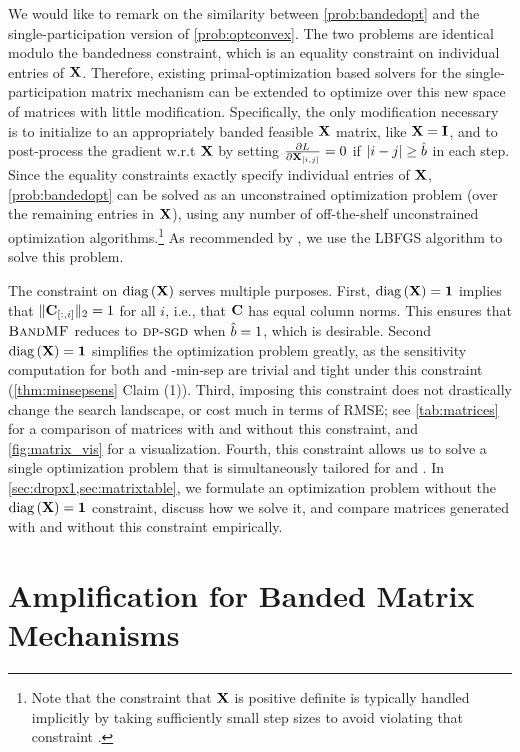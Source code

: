 \documentclass{article}
\begin{document}
%
We would like to remark on the similarity between \cref{prob:bandedopt} and the single-participation version of \cref{prob:optconvex}.  The two problems are identical modulo the bandedness constraint, which is an equality constraint on individual entries of $\mathbf{X}$.  Therefore, existing primal-optimization based solvers \cite{mckenna2021hdmm} for the single-participation matrix mechanism can be extended to optimize over this new space of matrices with little modification.  Specifically, the only modification necessary is to initialize to an appropriately banded feasible $\mathbf{X}$ matrix, like $\mathbf{X}=\mathbf{I}$, and to post-process the gradient w.r.t $\mathbf{X}$ by setting $\frac{\partial L}{\partial \mathbf{X}_{[i,j]}} = 0$ if $|i - j| \geq \hat{b}$ in each step.  Since the equality constraints exactly specify individual entries of $\mathbf{X}$, \cref{prob:bandedopt} can be solved as an unconstrained optimization problem (over the remaining entries in $\mathbf{X}$), using any number of off-the-shelf unconstrained optimization algorithms.\footnote{Note that the constraint that $\mathbf{X}$ is positive definite is typically handled implicitly by taking sufficiently small step sizes to avoid violating that constraint \cite{yuan2016convex,mckenna2021hdmm}.}  As recommended by \citet{mckenna2021hdmm}, we use the LBFGS algorithm \cite{byrd1995limited} to solve this problem.  

%
The constraint on $\operatorname{diag}{(\mathbf{X})}$ serves multiple purposes.  First, $\operatorname{diag}{(\mathbf{X})} = \bf1$ implies that $ \| \mathbf{C}_{[:,i]} \|_2 = 1$ for all $i$, i.e., that $\mathbf{C}$ has equal column norms.  This ensures that $\textsc{BandMF}$ reduces to $\textsc{dp-sgd}$ when $\hat{b}=1$, which is desirable.  Second $\operatorname{diag}{(\mathbf{X})} = \bf1$ simplifies the optimization problem greatly, as the sensitivity computation for both \multiepochpart and \minsep-min-sep are trivial and tight under this constraint (\cref{thm:minsepsens} Claim (1)).  Third, imposing this constraint does not drastically change the search landscape, or cost much in terms of RMSE; see \cref{tab:matrices} for a comparison of matrices with and without this constraint, and \cref{fig:matrix_vis} for a visualization.  Fourth, this constraint allows us to solve a single optimization problem that is simultaneously tailored for \multiepochpart and \bparticipation.  In \cref{sec:dropx1,sec:matrixtable}, we formulate an optimization problem without the $\operatorname{diag}{(\mathbf{X})} = \mathbf{1}$ constraint, discuss how we solve it, and compare matrices generated with and without this constraint empirically.
%
\section{Amplification for Banded Matrix Mechanisms}\label{sec:amplification}
\end{document}
